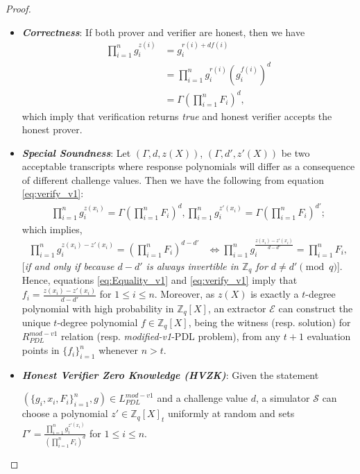 \begin{proof}
  \begin{itemize}
    \item \textit{\textbf{Correctness}}: If both prover and verifier are honest, then we have 
      \begin{align}\label{eq:verify_v1}
        \prod_{i=1}^{n}g_i^{z(i)}&=g_i^{r(i)+df(i)}\nonumber\\
        &=\prod_{i=1}^{n}g_i^{r(i)}(g_i^{f(i)})^d\nonumber\\
        &=\Gamma (\prod_{i=1}^{n}F_i)^d,
      \end{align}
      which imply that verification returns \textit{true} and honest verifier accepts the honest prover.
    \item \textit{\textbf{Special Soundness}}: Let $(\Gamma,d,z(X))$, $(\Gamma,d',z'(X))$ 
      be two acceptable transcripts where response polynomials will differ as a consequence of different challenge 
      values. Then we have the following from equation \ref{eq:verify_v1}:
      \begin{align*}
        \prod_{i=1}^{n}g_i^{z(x_i)}=\Gamma (\prod_{i=1}^{n}F_i)^d,\prod_{i=1}^{n}g_i^{z'(x_i)}=\Gamma (\prod_{i=1}^{n}F_i)^{d'};
      \end{align*}
      which implies,
      \begin{align}\label{eq:Equality_v1}
        \prod_{i=1}^{n}g_i^{z(x_i)-z'(x_i)}=(\prod_{i=1}^{n}F_i)^{d-d'} &\iff \prod_{i=1}^{n}g_i^{\frac{z(x_i)-z'(x_i)}{d-d'}}=\prod_{i=1}^{n}F_i,
      \end{align}
      [\textit{if and only if because $d-d'$ is always invertible in $\mathbb{Z}_q$ for $d\neq d'\pmod{q}$}]. 
      Hence, equations \ref{eq:Equality_v1} and \ref{eq:verify_v1} imply that $f_i=\frac{z(x_i)-z'(x_i)}{d-d'}$ for 
      $1\leq i\leq n$. Moreover, as $z(X)$ is exactly a $t$-degree polynomial with high probability in 
      $\mathbb{Z}_q[X]$, an extractor $\mathcal{E}$ can construct the unique $t$-degree 
      polynomial $f\in\mathbb{Z}_q[X]$, being the witness (resp. solution) for $R_{PDL}^{mod-v1}$ relation (resp. \textit{modified-v1}-PDL problem), 
      from any $t+1$ evaluation points in $\{f_i\}_{i=1}^n$ whenever $n>t$.
    \item \textit{\textbf{Honest Verifier Zero Knowledge (HVZK)}}: Given the statement\par $(\{g_i,x_i,F_i\}_{i=1}^n,g)\in L_{PDL}^{mod-v1}$  
      and a challenge value $d$, a simulator $\mathcal{S}$ can choose a polynomial $z'\in\mathbb{Z}_q[X]_{t}$ uniformly 
      at random and sets $\Gamma'=\frac{\prod_{i=1}^{n}g_i^{z'(x_i)}}{(\prod_{i=1}^{n}F_i)^d}$ for $1\leq i\leq n$. 

\end{itemize}
\end{proof}
